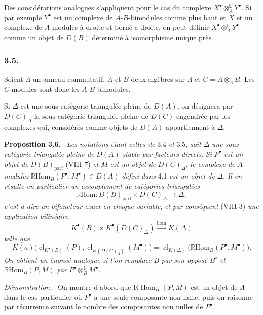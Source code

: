 \documentclass[11pt]{article}
\newenvironment{statement}[1]{\par\medskip\noindent\textbf{#1.}\ }{\par\medskip}
\newenvironment{prooftext}[1][Proof]{\par\noindent\emph{#1.}\ }{\par\medskip}
\DeclareMathOperator{\Hom}{Hom}
\newcommand{\R}{\mathbb{R}}\newcommand{\RHomCore}{\mathbb{R}\mathrm{Hom}}
\providecommand{\RHom}{\RHomCore}
\providecommand{\cl}{\operatorname{cl}}
\providecommand{\parf}{\mathrm{parf}}
\providecommand{\RHom}{\RHomCore}
\providecommand{\Hom}{\operatorname{Hom}}
\providecommand{\RHom}{\R\mathcal{H}om}
\providecommand{\R}{\mathrm R}
\providecommand{\cl}{\operatorname{cl}}
\providecommand{\parf}{\mathrm{parf}}
\providecommand{\RHom}{\RHomCore}
\providecommand{\Hom}{\operatorname{Hom}}
\providecommand{\cl}{\operatorname{cl}}
\begin{document}
Des considérations analogues s'appliquent pour le cas du complexe $X^\bullet\otimes_A^{\mathbb L}Y^\bullet$. Si par exemple $Y^\bullet$ est un complexe de $A$-$B$-bimodules comme plus haut et $X$ et un complexe de $A$-modules à droite et borné a droite, on peut définir $X^\bullet\otimes_A^{\mathbb L}Y^\bullet$ comme un objet de $D(B)$ déterminé à isomorphisme unique près.

\subsubsection*{3.5.}

Soient $\Lambda$ un anneau commutatif, $A$ et $B$ deux algèbres sur $\Lambda$ et
$C=A\otimes_{\Lambda}B$. Les $C$-modules sont donc les $A$-$B$-bimodules.

Si $\Delta$ est une sous-catégorie triangulée pleine de $D(A)$, on désignera par $D(C)_{\Delta}$ la sous-catégorie triangulée pleine de $D(C)$ engendrée par les complexes qui, considérés comme objets de $D(A)$ appartiennent à $\Delta$.

\begin{statement}{Proposition 3.6}
\emph{Les notations étant celles de} 3.4 \emph{et} 3.5, \emph{soit} $\Delta$ \emph{une sous-catégorie triangulée pleine de} $D(A)$ \emph{stable par facteurs directs}. \emph{Si} $P^\bullet$ \emph{est un objet de} $D(B)_{\parf}$ (VIII 7) \emph{et} $M$ \emph{est un objet de} $D(C)_{\Delta}$, \emph{le complexe de} $A$-\emph{modules} $\RHom_B(P^\bullet,M^\bullet)\in D(A)$ \emph{défini dans} 4.1 \emph{est un objet de} $\Delta$. \emph{Il en résulte en particulier un accouplement de catégories triangulées}
\[
\RHom:D(B)_{\parf}\times D(C)_{\Delta}\longrightarrow \Delta,
\tag{3.6.1}
\]
\emph{c'est-à-dire un bifoncteur exact en chaque variable}, \emph{et par conséquent} (VIII 3) \emph{une application bilinéaire}:
\[
K^{\bullet}(B)\times K^{\bullet}(D(C)_{\Delta})\xrightarrow{\operatorname{hom}} K(\Delta)
\tag{3.6.2}
\]
\emph{telle que}
\[
K(a)\bigl(\cl_{K^{\bullet}(B)}(P),\cl_{K(D(C)_{\Lambda})}(M^\bullet)\bigr)
=\cl_{K(\Delta)}\bigl(\RHom_B(P^\bullet,M^\bullet)\bigr).
\tag{3.6.3}
\]
\emph{On obtient un énoncé analogue si l'on remplace} $B$ \emph{par son opposé} $B^\circ$ \emph{et} $\RHom_B(P,M)$ \emph{par} $P^\bullet\otimes_B^{\mathbb L}M^\bullet$.
\end{statement}

\begin{prooftext}[Démonstration]
On montre d'abord que $\mathrm{R}\Hom_B(P,M)$ est un objet de $\Lambda$ dans le cas particulier où $P^\bullet$ a une seule composante non nulle, puis on raisonne par récurrence suivant le nombre des composantes non nulles de $P^\bullet$.
\end{prooftext}
\end{document}
